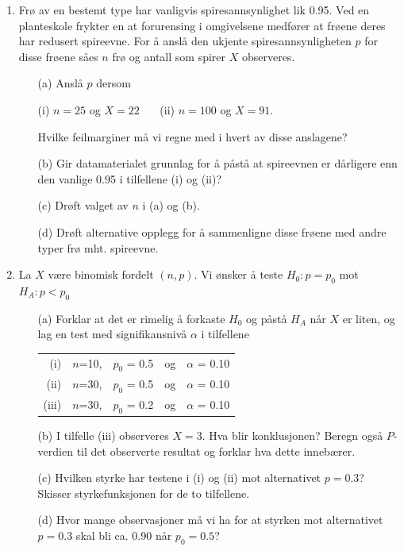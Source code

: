 \begin{enumerate}
\item Frø av en bestemt type har vanligvis spiresannsynlighet lik
0.95. Ved en planteskole frykter en at forurensing i
omgivelsene medfører at frøene deres har redusert spireevne.
For å anslå den ukjente spiresannsynligheten $p$ for disse
frøene såes $n$ frø og antall som spirer $X$ observeres.
\begin{itemize}
\item[(a)] Anslå $p$ dersom
\begin{center}
(i) $n=25$ og $X=22$ \ \ \   (ii) $n=100$ og $X=91$.
\end{center}
    Hvilke feilmarginer må vi regne med i hvert av disse anslagene?
\item[(b)] Gir datamaterialet grunnlag for å påstå at spireevnen
er dårligere enn den vanlige 0.95 i tilfellene (i) og (ii)?
\item[(c)] Drøft valget av $n$ i (a) og (b).
\item[(d)] Drøft alternative opplegg for å sammenligne disse
    frøene med andre typer frø mht. spireevne.
\end{itemize}

\item La $X$ være binomisk fordelt $(n,p)$. Vi ønsker å teste
$H_0:p=p_0$  mot  $H_A:p<p_0$
\begin{itemize}
\item[(a)] Forklar at det er rimelig å forkaste $H_0$ og
    påstå $H_A$ når $X$ er liten, og lag en test
   med signifikansnivå $\alpha$ i tilfellene
  \begin{center}
  \begin{tabular}{rcccc}
   (i) & $n$=10, & $p_0$ = 0.5  & og & $\alpha$ = 0.10 \\
  (ii) & $n$=30, & $p_0$ = 0.5  & og & $\alpha$ = 0.10 \\
  (iii)& $n$=30, & $p_0$ = 0.2  & og & $\alpha$ = 0.10 
  \end{tabular}
  \end{center}
\item[(b)] I tilfelle (iii) observeres $X=3$. Hva blir
   konklusjonen? Beregn også $P$-verdien til det observerte
   resultat og forklar hva dette innebærer.
\item[(c)] Hvilken styrke har testene i (i) og (ii) mot
   alternativet $p=0.3$? Skisser styrkefunksjonen for de
   to tilfellene.
\item[(d)] Hvor mange observasjoner må vi ha for at styrken mot
   alternativet $p=0.3$ skal bli ca. 0.90 når $p_0=0.5$?
\end{itemize}


\end{enumerate}
